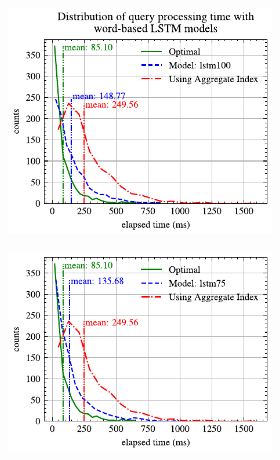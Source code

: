 \documentclass[conference]{IEEEtran}
\begin{document}
\begin{figure}[!th]
	\centering
	\begin{subfigure}{0.45\textwidth}
		\begin{subfigure}{\textwidth}
			\centering
%			
			\includegraphics[]{graphics/perf_dist_lstm100_A.pdf}
		\end{subfigure}
		\vfill
		\begin{subfigure}{\textwidth}
			\centering
			\includegraphics[]{graphics/perf_dist_lstm75_A.pdf}
		\end{subfigure}
		\vfill
		\begin{subfigure}{\textwidth}
			\centering

\end{subfigure}
\end{subfigure}
\end{figure}
\end{document}
